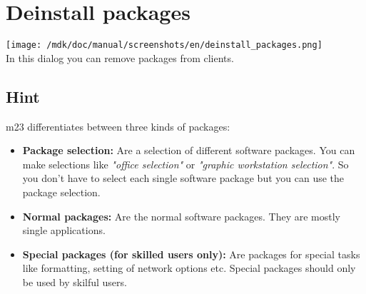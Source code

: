 \section{Deinstall packages}
\texttt{[image: /mdk/doc/manual/screenshots/en/deinstall\_packages.png]} \\
In this dialog you can remove packages from clients.\\
\subsection{Hint}
m23 differentiates between three kinds of packages:\\
\begin{itemize}
\item \textbf{Package selection:} Are a selection of different software packages. You can make selections like \textit{"office selection"} or \textit{"graphic workstation selection"}. So you don't have to select each single software package but you can use the package selection.\\
\item \textbf{Normal packages:} Are the normal software packages. They are mostly single applications.\\
\item \textbf{Special packages (for skilled users only):} Are packages for special tasks like formatting, setting of network options etc. Special packages should only be used by skilful users.\\
\end{itemize}
